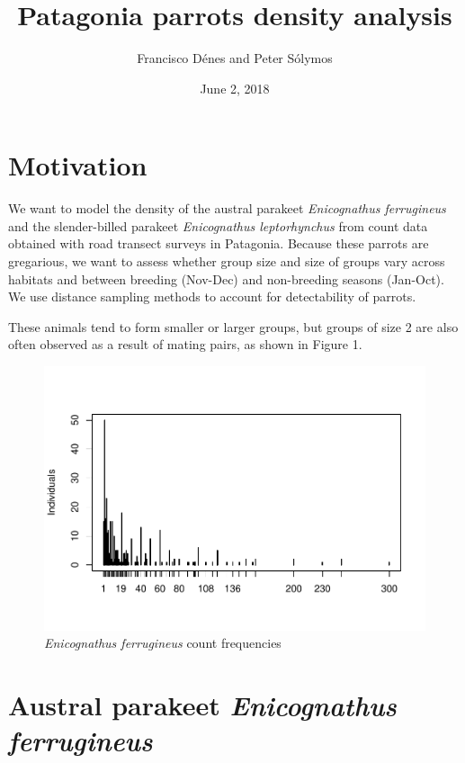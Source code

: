 \documentclass[]{article}
\title{Patagonia parrots density analysis}
\author{Francisco Dénes and Peter Sólymos}
\date{June 2, 2018}
\begin{document}
\maketitle

\section{Motivation}\label{motivation}

We want to model the density of the austral parakeet \emph{Enicognathus
ferrugineus} and the slender-billed parakeet \emph{Enicognathus
leptorhynchus} from count data obtained with road transect surveys in
Patagonia. Because these parrots are gregarious, we want to assess
whether group size and size of groups vary across habitats and between
breeding (Nov-Dec) and non-breeding seasons (Jan-Oct). We use distance
sampling methods to account for detectability of parrots.

These animals tend to form smaller or larger groups, but groups of size
2 are also often observed as a result of mating pairs, as shown in
Figure 1.

\begin{figure}[H]
\includegraphics{Patagonia_parrots_density_analysis_files/figure-latex/unnamed-chunk-1-1} \caption{\textit{Enicognathus ferrugineus} count frequencies}\label{fig:unnamed-chunk-1}
\end{figure}

\section{\texorpdfstring{Austral parakeet \emph{Enicognathus
ferrugineus}}{Austral parakeet Enicognathus ferrugineus}}\label{austral-parakeet-enicognathus-ferrugineus}
\end{document}
